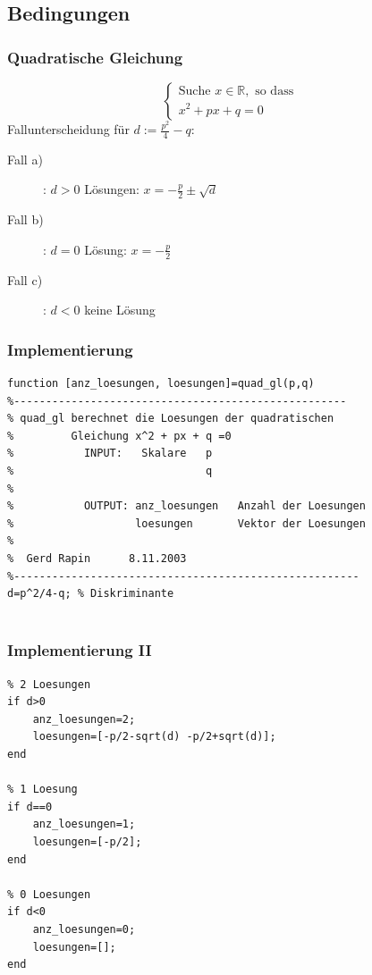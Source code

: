 \documentclass[hyperref={xetex}]{beamer}
\begin{document}
\subsection{Bedingungen}
%
%
%
\begin{frame}[fragile]\frametitle{Quadratische Gleichung}
\alert{ \[  \left\{ \begin{array}{l} \mbox{Suche }  x \in \mathbb{R},
 \mbox{ so dass } \\
 x^2+px +q =0  \end{array} \right. \]}
Fallunterscheidung für $d:=\frac{p^2}{4} -q$:
\begin{description}
\item [Fall a)]: \alert{ $d>0$}  Lösungen: $x=-\frac{p}{2} \pm \sqrt{d}$ \\
\item [Fall b)]: \alert{ $d=0$}  Lösung: $x=-\frac{p}{2}$\\
\item [Fall c)]: \alert{ $d<0$} \quad keine Lösung
\end{description}
\end{frame} 
%
%
%
\begin{frame}[fragile]\frametitle{Implementierung}
\begin{lstlisting}
function [anz_loesungen, loesungen]=quad_gl(p,q)
%----------------------------------------------------
% quad_gl berechnet die Loesungen der quadratischen   
%         Gleichung x^2 + px + q =0
%           INPUT:   Skalare   p
%                              q
%                 
%           OUTPUT: anz_loesungen   Anzahl der Loesungen
%                   loesungen       Vektor der Loesungen
%
%  Gerd Rapin      8.11.2003
%------------------------------------------------------
d=p^2/4-q; % Diskriminante


\end{lstlisting}
\end{frame}
%
%
%
\begin{frame}[fragile]\frametitle{Implementierung II}
\begin{lstlisting}
% 2 Loesungen
if d>0 
    anz_loesungen=2;
    loesungen=[-p/2-sqrt(d) -p/2+sqrt(d)];
end

% 1 Loesung
if d==0 
    anz_loesungen=1;
    loesungen=[-p/2];
end

% 0 Loesungen
if d<0 
    anz_loesungen=0;
    loesungen=[];
end
\end{lstlisting}
\end{frame}
\end{document}
